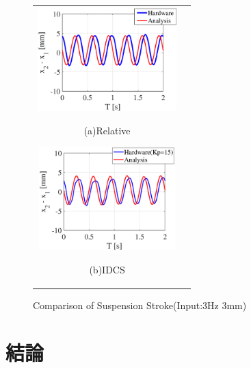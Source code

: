 \documentclass[a4paper,12pt]{article_vdlab_sotsuron}
\begin{document}
\begin{figure}[h]
  \begin{tabular}{cc}
  \begin{minipage}{0.5\hsize}
  \begin{center}
    \includegraphics[height=40mm]{figure/hils_rela_3_3.eps}
    \end{center}
    \begin{center}
    \ (a)Relative\
    \end{center}
  \end{minipage}
  \begin{minipage}{0.5\hsize}
     \begin{center}
      \includegraphics[height=40mm]{figure/hils_idcs_3_3.eps}
      \end{center}
      \begin{center}
      \ (b)IDCS\
    \end{center}
  \end{minipage}
  \end{tabular}
  \vspace*{2mm}
  \caption{Comparison of Suspension Stroke(Input:3Hz 3mm)}
    \label{fig:hils_3_3}
\end{figure}

\newpage
\section{結論}



\end{document}
